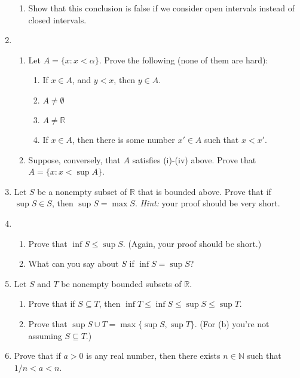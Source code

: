 \documentclass[letterpaper,12pt]{article}
\newcommand{\N}{\mathbb{N}}
\newcommand{\R}{\mathbb{R}}
\begin{document}
\begin{enumerate}
\begin{enumerate}
	\item Show that this conclusion is false if we consider open intervals instead of closed intervals.
       \end{enumerate}
 \item \begin{enumerate}
        \item Let $A = \{x:x<\alpha\}$. Prove the following (none of them are hard):
\begin{enumerate}
 \item If $x\in A$, and $y<x$, then $y\in A$.
 \item $A\neq \emptyset$
 \item $A\neq\R$
 \item If $x\in A$, then there is some number $x'\in A$ such that $x<x'$.
\end{enumerate}
	\item Suppose, conversely, that $A$ satisfies (i)-(iv) above. Prove that $A=\{x : x<\sup A\}$.
\end{enumerate}
 \item Let $S$ be a nonempty subset of $\R$ that is bounded above. Prove that if $\sup S\in S$, then $\sup S = \max S$. {\em Hint:} your proof should be very short.
 \item \begin{enumerate}
        \item Prove that $\inf S\leq \sup S$. (Again, your proof should be short.)
	\item What can you say about $S$ if $\inf S = \sup S$?
       \end{enumerate}
\item Let $S$ and $T$ be nonempty bounded subsets of $\R$. 
\begin{enumerate}
 \item Prove that if $S\subseteq T$, then $\inf T\leq \inf S\leq \sup S\leq \sup T$.
 \item Prove that $\sup S\cup T = \max\{\sup S, \sup T\}$. (For (b) you're not assuming $S\subseteq T$.)
\end{enumerate}
\item Prove that if $a>0$ is any real number, then there exists $n\in \N$ such that $1/n<a<n$.

       


\end{enumerate}
 
\end{document}

